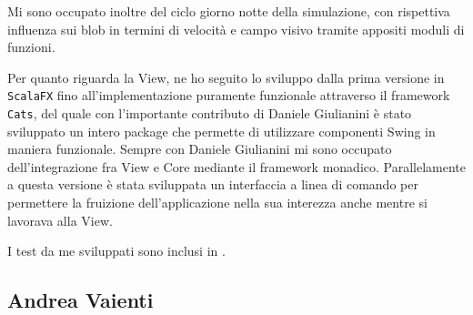 Mi sono occupato inoltre del ciclo giorno notte della simulazione, con rispettiva influenza sui blob in termini di velocità e campo visivo tramite appositi moduli di funzioni.

Per quanto riguarda la View, ne ho seguito lo sviluppo dalla prima versione in \texttt{ScalaFX} fino all'implementazione puramente funzionale attraverso il framework \texttt{Cats}, del quale con l'importante contributo di Daniele Giulianini è stato sviluppato un intero package che permette di utilizzare componenti Swing in maniera funzionale. Sempre con Daniele Giulianini mi sono occupato dell'integrazione fra View e Core mediante il framework monadico. Parallelamente a questa versione è stata sviluppata un interfaccia a linea di comando per permettere la fruizione dell'applicazione nella sua interezza anche mentre si lavorava alla View.

I test da me sviluppati sono inclusi in .

\subsection{Andrea Vaienti}